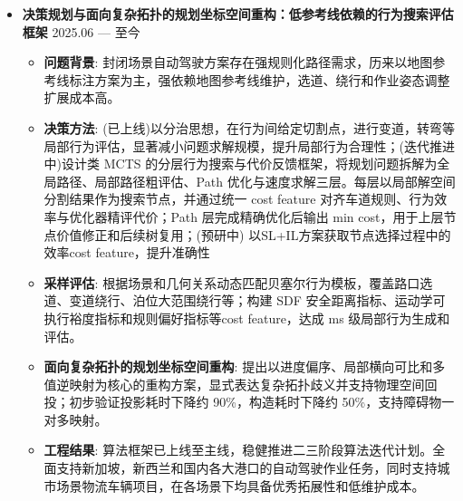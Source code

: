 \documentclass[zh]{resume}
\begin{document}
\begin{itemize}
  \item \textbf{决策规划与面向复杂拓扑的规划坐标空间重构：低参考线依赖的行为搜索评估框架} \hfill 2025.06 --- 至今
  \begin{itemize}
    \item \textbf{问题背景}: 封闭场景自动驾驶方案存在强规则化路径需求，历来以地图参考线标注方案为主，强依赖地图参考线维护，选道、绕行和作业姿态调整扩展成本高。
    \item \textbf{决策方法}: (已上线)以分治思想，在行为间给定切割点，进行变道，转弯等局部行为评估，显著减小问题求解规模，提升局部行为合理性；(迭代推进中)设计类 MCTS 的分层行为搜索与代价反馈框架，将规划问题拆解为全局路径、局部路径粗评估、Path 优化与速度求解三层。每层以局部解空间分割结果作为搜索节点，并通过统一 cost feature 对齐车道规则、行为效率与优化器精评代价；Path 层完成精确优化后输出 min cost，用于上层节点价值修正和后续树复用；(预研中) 以SL+IL方案获取节点选择过程中的效率cost feature，提升准确性
    \item \textbf{采样评估}: 根据场景和几何关系动态匹配贝塞尔行为模板，覆盖路口选道、变道绕行、泊位大范围绕行等；构建 SDF 安全距离指标、运动学可执行裕度指标和规则偏好指标等cost feature，达成 ms 级局部行为生成和评估。
    \newpage
    \item \textbf{面向复杂拓扑的规划坐标空间重构}: 提出以进度偏序、局部横向可比和多值逆映射为核心的重构方案，显式表达复杂拓扑歧义并支持物理空间回投；初步验证投影耗时下降约 90\%，构造耗时下降约 50\%，支持障碍物一对多映射。
    \item \textbf{工程结果}: 算法框架已上线至主线，稳健推进二三阶段算法迭代计划。全面支持新加坡，新西兰和国内各大港口的自动驾驶作业任务，同时支持城市场景物流车辆项目，在各场景下均具备优秀拓展性和低维护成本。
  \end{itemize}


\end{itemize}
\end{document}
